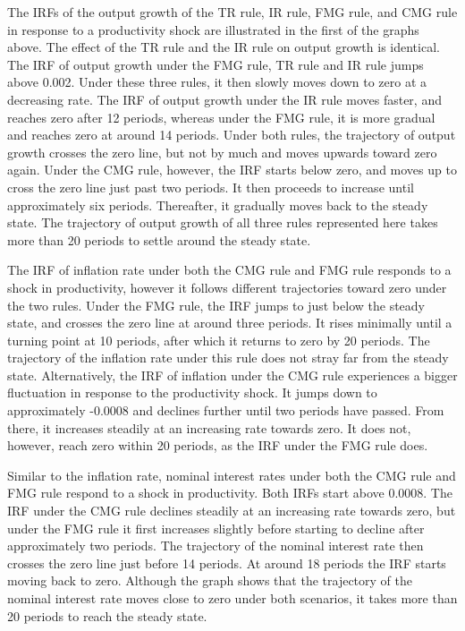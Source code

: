 \documentclass[11pt,preprint, authoryear]{elsarticle}
\numberwithin{equation}{section}
\numberwithin{figure}{section}
\numberwithin{table}{section}
\begin{document}
The IRFs of the output growth of the TR rule, IR rule, FMG rule, and CMG
rule in response to a productivity shock are illustrated in the first of
the graphs above. The effect of the TR rule and the IR rule on output
growth is identical. The IRF of output growth under the FMG rule, TR
rule and IR rule jumps above 0.002. Under these three rules, it then
slowly moves down to zero at a decreasing rate. The IRF of output growth
under the IR rule moves faster, and reaches zero after 12 periods,
whereas under the FMG rule, it is more gradual and reaches zero at
around 14 periods. Under both rules, the trajectory of output growth
crosses the zero line, but not by much and moves upwards toward zero
again. Under the CMG rule, however, the IRF starts below zero, and moves
up to cross the zero line just past two periods. It then proceeds to
increase until approximately six periods. Thereafter, it gradually moves
back to the steady state. The trajectory of output growth of all three
rules represented here takes more than 20 periods to settle around the
steady state.

The IRF of inflation rate under both the CMG rule and FMG rule responds
to a shock in productivity, however it follows different trajectories
toward zero under the two rules. Under the FMG rule, the IRF jumps to
just below the steady state, and crosses the zero line at around three
periods. It rises minimally until a turning point at 10 periods, after
which it returns to zero by 20 periods. The trajectory of the inflation
rate under this rule does not stray far from the steady state.
Alternatively, the IRF of inflation under the CMG rule experiences a
bigger fluctuation in response to the productivity shock. It jumps down
to approximately -0.0008 and declines further until two periods have
passed. From there, it increases steadily at an increasing rate towards
zero. It does not, however, reach zero within 20 periods, as the IRF
under the FMG rule does.

Similar to the inflation rate, nominal interest rates under both the CMG
rule and FMG rule respond to a shock in productivity. Both IRFs start
above 0.0008. The IRF under the CMG rule declines steadily at an
increasing rate towards zero, but under the FMG rule it first increases
slightly before starting to decline after approximately two periods. The
trajectory of the nominal interest rate then crosses the zero line just
before 14 periods. At around 18 periods the IRF starts moving back to
zero. Although the graph shows that the trajectory of the nominal
interest rate moves close to zero under both scenarios, it takes more
than 20 periods to reach the steady state.
\end{document}
